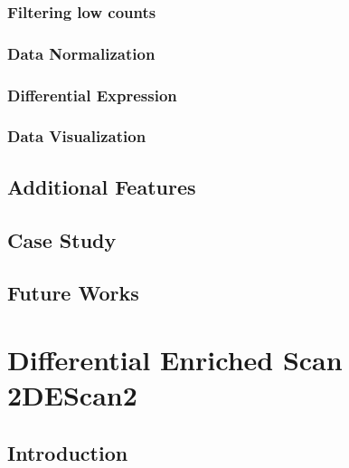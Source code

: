 \documentclass[b5paper,oneside,british,intoc,bibliograph=totoc,index=totoc,BCOR10mm,twoside,openright]{book}
\numberwithin{equation}{section}
\numberwithin{figure}{section}
\begin{document}
\subsection{Filtering low counts} \label{sec:ticorserfiltering}


\subsection{Data Normalization} \label{sec:ticorsernormalization}


\subsection{Differential Expression} \label{sec:ticorsermethods}


\subsection{Data Visualization} \label{sec:ticorserplots}


\section{Additional Features} \label{sec:ticorseraddfeat}


\section{Case Study} \label{sec:ticorseresults}


\section{Future Works} \label{sec:ticorseconclusions}


\chapter{Differential Enriched Scan 2\newline DEScan2} \label{sec:descan2cap}


\section{Introduction} \label{sec:descan2intro}

\end{document}

